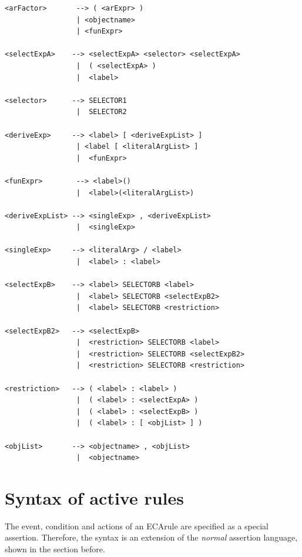 {\begin{verbatim}
<arFactor>       --> ( <arExpr> )
                 | <objectname>
                 | <funExpr>

<selectExpA>    --> <selectExpA> <selector> <selectExpA>
                 |  ( <selectExpA> )
                 |  <label>

<selector>      --> SELECTOR1
                 |  SELECTOR2

<deriveExp>     --> <label> [ <deriveExpList> ]
                 | <label [ <literalArgList> ]
                 |  <funExpr>

<funExpr>        --> <label>()
                 |  <label>(<literalArgList>)

<deriveExpList> --> <singleExp> , <deriveExpList>
                 |  <singleExp>

<singleExp>     --> <literalArg> / <label>
                 |  <label> : <label>

<selectExpB>    --> <label> SELECTORB <label>
                 |  <label> SELECTORB <selectExpB2>
                 |  <label> SELECTORB <restriction>

<selectExpB2>   --> <selectExpB>
                 |  <restriction> SELECTORB <label>
                 |  <restriction> SELECTORB <selectExpB2>
                 |  <restriction> SELECTORB <restriction>

<restriction>   --> ( <label> : <label> )
                 |  ( <label> : <selectExpA> )
                 |  ( <label> : <selectExpB> )
                 |  ( <label> : [ <objList> ] )

<objList>       --> <objectname> , <objList>
                 |  <objectname>
\end{verbatim}
}


\section{Syntax of active rules}
\label{sec:ecasyntax}

The event, condition and actions of an ECArule are specified as a special
assertion. Therefore, the syntax is an extension of the {\em normal} assertion
language, shown in the section before.

